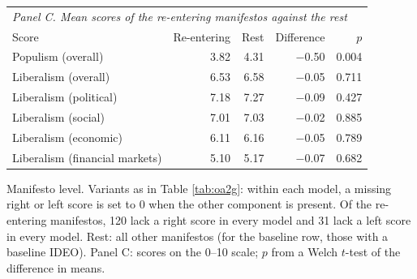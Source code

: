 \begin{table}[ht]
{\begin{tabular}{lrrrrrrr}
\multicolumn{8}{l}{\emph{Panel C. Mean scores of the re-entering manifestos against the rest}} \\
Score & \multicolumn{2}{r}{Re-entering} & \multicolumn{2}{r}{Rest} & \multicolumn{2}{r}{Difference} & $p$ \\
\midrule
Populism (overall) & \multicolumn{2}{r}{3.82} & \multicolumn{2}{r}{4.31} & \multicolumn{2}{r}{$-$0.50} & 0.004 \\
Liberalism (overall) & \multicolumn{2}{r}{6.53} & \multicolumn{2}{r}{6.58} & \multicolumn{2}{r}{$-$0.05} & 0.711 \\
Liberalism (political) & \multicolumn{2}{r}{7.18} & \multicolumn{2}{r}{7.27} & \multicolumn{2}{r}{$-$0.09} & 0.427 \\
Liberalism (social) & \multicolumn{2}{r}{7.01} & \multicolumn{2}{r}{7.03} & \multicolumn{2}{r}{$-$0.02} & 0.885 \\
Liberalism (economic) & \multicolumn{2}{r}{6.11} & \multicolumn{2}{r}{6.16} & \multicolumn{2}{r}{$-$0.05} & 0.789 \\
Liberalism (financial markets) & \multicolumn{2}{r}{5.10} & \multicolumn{2}{r}{5.17} & \multicolumn{2}{r}{$-$0.07} & 0.682 \\
\bottomrule
\end{tabular}}
\par\smallskip
\begin{minipage}{\linewidth}\scriptsize Manifesto level. Variants as in Table \ref{tab:oa2g}: within each model, a missing right or left score is set to 0 when the other component is present. Of the re-entering manifestos, 120 lack a right score in every model and 31 lack a left score in every model. Rest: all other manifestos (for the baseline row, those with a baseline IDEO). Panel C: scores on the 0--10 scale; $p$ from a Welch $t$-test of the difference in means.\end{minipage}
\end{table}
